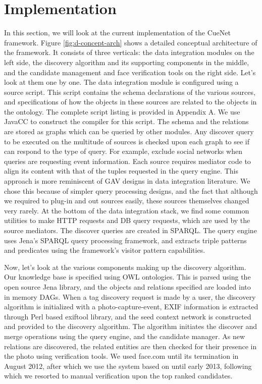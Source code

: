 \section{Implementation}

In this section, we will look at the current implementation of the CueNet framework. Figure \ref{fig:d-concept-arch} shows a detailed conceptual architecture of the framework. It consists of three verticals: the data integration modules on the left side, the discovery algorithm and its supporting components in the middle, and the candidate management and face verification tools on the right side. Let's look at them one by one. The data integration module is configured using a source script. This script contains the schema declarations of the various sources, and specifications of how the objects in these sources are related to the objects in the ontology. The complete script listing is provided in Appendix A. We use JavaCC to construct the compiler for this script. The schema and the relations are stored as graphs which can be queried by other modules. Any discover query to be executed on the multitude of sources is checked upon each graph to see if can respond to the type of query. For example, exclude social networks when queries are requesting event information. Each source requires mediator code to align its content with that of the tuples requested in the query engine. This approach is more reminiscent of GAV designs in data integration literature. We chose this because of simpler query processing designs, and the fact that although we required to plug-in and out sources easily, these sources themselves changed very rarely. At the bottom of the data integration stack, we find some common utilities to make HTTP requests and DB query requests, which are used by the source mediators. The discover queries are created in SPARQL. The query engine uses Jena's SPARQL query processing framework, and extracts triple patterns and predicates using the framework's visitor pattern capabilities.

Now, let's look at the various components making up the discovery algorithm. Our knowledge base is specified using OWL ontologies. This is parsed using the open source Jena library, and the objects and relations specified are loaded into in memory DAGs. When a tag discovery request is made by a user, the discovery algorithm is initialized with a photo-capture-event, EXIF information is extracted through Perl based exiftool library, and the seed context network is constructed and provided to the discovery algorithm. The algorithm initiates the discover and merge operations using the query engine, and the candidate manager. As new relations are discovered, the related entities are then checked for their presence in the photo using verification tools. We used face.com until its termination in August 2012, after which we use the system based on \cite{nk_attribute_classifiers} until early 2013, following which we resorted to manual verification upon the top ranked candidates.

